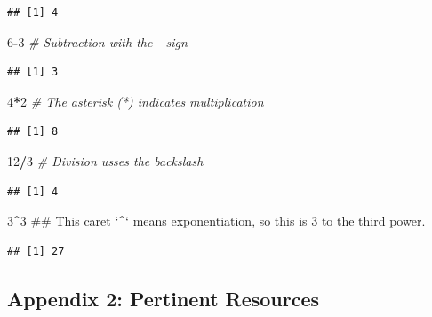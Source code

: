 \documentclass[]{article}
\newenvironment{Shaded}{\begin{snugshade}}{\end{snugshade}}
\newcommand{\DecValTok}[1]{\textcolor[rgb]{0.00,0.00,0.81}{#1}}
\newcommand{\CommentTok}[1]{\textcolor[rgb]{0.56,0.35,0.01}{\textit{#1}}}
\newcommand{\OperatorTok}[1]{\textcolor[rgb]{0.81,0.36,0.00}{\textbf{#1}}}
\newcommand{\NormalTok}[1]{#1}
\begin{document}
\begin{verbatim}
## [1] 4
\end{verbatim}

\begin{Shaded}
\begin{Highlighting}[]
\DecValTok{6}\OperatorTok{-}\DecValTok{3} \CommentTok{# Subtraction with the - sign}
\end{Highlighting}
\end{Shaded}

\begin{verbatim}
## [1] 3
\end{verbatim}

\begin{Shaded}
\begin{Highlighting}[]
\DecValTok{4}\OperatorTok{*}\DecValTok{2} \CommentTok{# The asterisk (*) indicates multiplication}
\end{Highlighting}
\end{Shaded}

\begin{verbatim}
## [1] 8
\end{verbatim}

\begin{Shaded}
\begin{Highlighting}[]
\DecValTok{12}\OperatorTok{/}\DecValTok{3} \CommentTok{# Division usses the backslash}
\end{Highlighting}
\end{Shaded}

\begin{verbatim}
## [1] 4
\end{verbatim}

\begin{Shaded}
\begin{Highlighting}[]
\DecValTok{3}\OperatorTok{^}\DecValTok{3}\NormalTok{ ## This caret `^` means exponentiation, so this is 3 to the third power.}
\end{Highlighting}
\end{Shaded}

\begin{verbatim}
## [1] 27
\end{verbatim}

\pagebreak 

\subsection{Appendix 2: Pertinent
Resources}\label{appendix-2-pertinent-resources}
\end{document}
